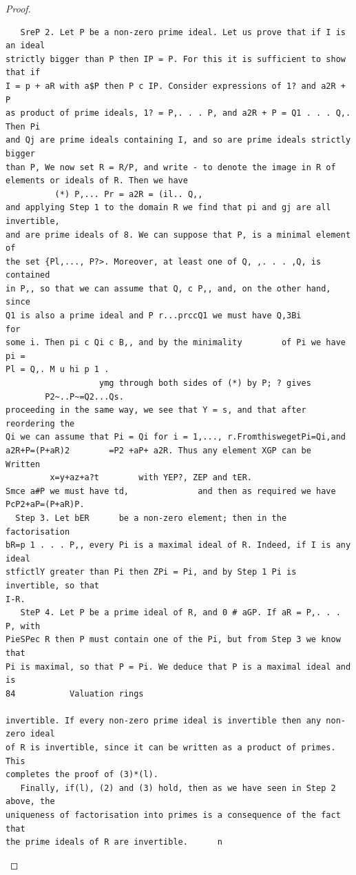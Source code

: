 \begin{proof}
\begin{verbatim}
   SreP 2. Let P be a non-zero prime ideal. Let us prove that if I is an ideal
strictly bigger than P then IP = P. For this it is sufficient to show that if
I = p + aR with a$P then P c IP. Consider expressions of 1? and a2R + P
as product of prime ideals, 1? = P,. . . P, and a2R + P = Q1 . . . Q,. Then Pi
and Qj are prime ideals containing I, and so are prime ideals strictly bigger
than P, We now set R = R/P, and write - to denote the image in R of
elements or ideals of R. Then we have
          (*) P,... Pr = a2R = (il.. Q,,
and applying Step 1 to the domain R we find that pi and gj are all invertible,
and are prime ideals of 8. We can suppose that P, is a minimal element of
the set {Pl,..., P?>. Moreover, at least one of Q, ,. . . ,Q, is contained
in P,, so that we can assume that Q, c P,, and, on the other hand, since
Q1 is also a prime ideal and P r...prccQ1 we must have Q,3Bi                for
some i. Then pi c Qi c B,, and by the minimality        of Pi we have pi =
Pl = Q,. M u hi p 1 .
                   ymg through both sides of (*) by P; ? gives
        P2~..P~=Q2...Qs.
proceeding in the same way, we see that Y = s, and that after reordering the
Qi we can assume that Pi = Qi for i = 1,..., r.FromthiswegetPi=Qi,and
a2R+P=(P+aR)2        =P2 +aP+ a2R. Thus any element XGP can be
Written
         x=y+az+a?t        with YEP?, ZEP and tER.
Smce a#P we must have td,              and then as required we have
PcP2+aP=(P+aR)P.
  Step 3. Let bER      be a non-zero element; then in the factorisation
bR=p 1 . . . P,, every Pi is a maximal ideal of R. Indeed, if I is any ideal
stfictlY greater than Pi then ZPi = Pi, and by Step 1 Pi is invertible, so that
I-R.
   SteP 4. Let P be a prime ideal of R, and 0 # aGP. If aR = P,. . . P, with
PieSPec R then P must contain one of the Pi, but from Step 3 we know that
Pi is maximal, so that P = Pi. We deduce that P is a maximal ideal and is
84           Valuation rings

invertible. If every non-zero prime ideal is invertible then any non-zero ideal
of R is invertible, since it can be written as a product of primes. This
completes the proof of (3)*(l).
   Finally, if(l), (2) and (3) hold, then as we have seen in Step 2 above, the
uniqueness of factorisation into primes is a consequence of the fact that
the prime ideals of R are invertible.      n
\end{verbatim}
\end{proof}


